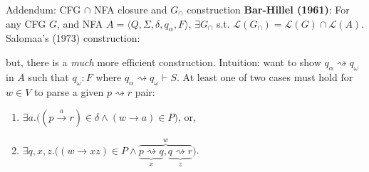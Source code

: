 \documentclass{beamer}
\begin{document}
\begin{frame}{Addendum: CFG $\cap$ NFA closure and $G_\cap$ construction}
  \textbf{Bar-Hillel (1961)}: For any CFG $G$, and NFA
  $A=\langle Q,\Sigma,\delta,q_\alpha,F\rangle$, $\exists G_\cap$ s.t.
  $\mathcal{L}(G_\cap)=\mathcal{L}(G)\cap\mathcal{L}(A)$. Salomaa's (1973) construction:

  \vspace{-0.1cm}
  \begin{center}
  \end{center}

  \vspace{0.1cm}
  but, there is a \textit{much} more efficient construction. Intuition: want to show $q_\alpha \rightsquigarrow q_\omega$ in $A$ such that $q_\omega: F$ where $q_\alpha \rightsquigarrow q_\omega \vdash S$. At least one of two cases must hold for $w \in V$ to parse a given $p \rightsquigarrow r$ pair:
  \begin{enumerate}\setlength\itemsep{0.25em}
    \item $\exists a.\big((p \overset{a}{\rightarrow} r)\in \delta \land (w \rightarrow a) \in P\big)$, or,
    \item $\exists q, x, z.\big((w \rightarrow xz) \in P\land\overbrace{\underbrace{p \rightsquigarrow q}_x, \underbrace{q \rightsquigarrow r}_z}^w\big)$.
  \end{enumerate}
\end{frame}
\end{document}
